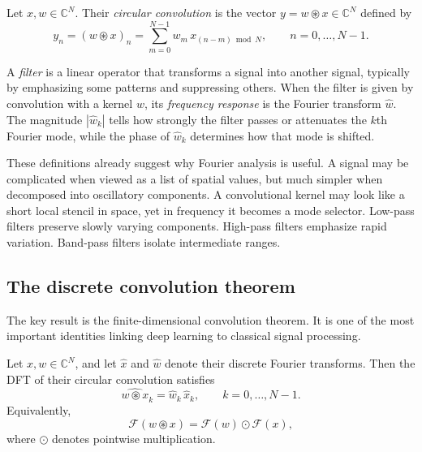 \begin{definition}
Let $x,w \in \mathbb{C}^N$.
Their \emph{circular convolution} is the vector $y = w \circledast x \in \mathbb{C}^N$ defined by
\[
 y_n = (w \circledast x)_n = \sum_{m=0}^{N-1} w_m\, x_{(n-m) \bmod N},
 \qquad n=0,\dots,N-1.
\]
\end{definition}

\begin{definition}
A \emph{filter} is a linear operator that transforms a signal into another signal, typically by emphasizing some patterns and suppressing others.
When the filter is given by convolution with a kernel $w$, its \emph{frequency response} is the Fourier transform $\widehat{w}$.
The magnitude $|\widehat{w}_k|$ tells how strongly the filter passes or attenuates the $k$th Fourier mode, while the phase of $\widehat{w}_k$ determines how that mode is shifted.
\end{definition}

\medskip

These definitions already suggest why Fourier analysis is useful.
A signal may be complicated when viewed as a list of spatial values, but much simpler when decomposed into oscillatory components.
A convolutional kernel may look like a short local stencil in space, yet in frequency it becomes a mode selector.
Low-pass filters preserve slowly varying components.
High-pass filters emphasize rapid variation.
Band-pass filters isolate intermediate ranges.

\subsection*{The discrete convolution theorem}

The key result is the finite-dimensional convolution theorem.
It is one of the most important identities linking deep learning to classical signal processing.

\begin{theorem}
Let $x,w \in \mathbb{C}^N$, and let $\widehat{x}$ and $\widehat{w}$ denote their discrete Fourier transforms.
Then the DFT of their circular convolution satisfies
\[
 \widehat{w \circledast x}_k = \widehat{w}_k \, \widehat{x}_k,
 \qquad k=0,\dots,N-1.
\]
Equivalently,
\[
 \mathcal{F}(w \circledast x) = \mathcal{F}(w) \odot \mathcal{F}(x),
\]
where $\odot$ denotes pointwise multiplication.
\end{theorem}

